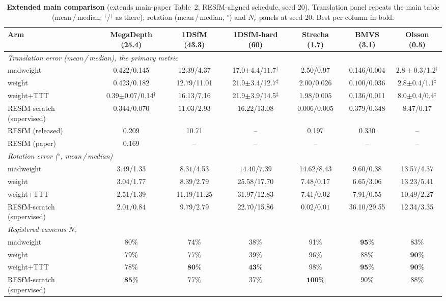 \documentclass[10pt,twocolumn,letterpaper]{article}
\renewcommand{\deg}{^{\circ}}
\begin{document}
\begin{table}[t]\centering\footnotesize
\caption{\textbf{Extended main comparison} (extends main-paper Table~2; RESfM-aligned
schedule, seed 20). Translation panel repeats the main table (mean\,/\,median;
$^{\dagger}$/$^{\ddagger}$ as there); rotation (mean\,/\,median, $\deg$) and $N_r$
panels at seed 20. Best per column in bold.}
\label{tab:x_main}
\setlength{\tabcolsep}{3pt}%
\begin{tabular}{lcccccc}
\toprule
Arm & MegaDepth (25.4) & 1DSfM (43.3) & 1DSfM-hard (60) & Strecha (1.7) & BMVS (3.1) & Olsson (0.5)\\
\midrule
\multicolumn{7}{l}{\emph{Translation error (mean\,/\,median), the primary metric}}\\[1pt]
madweight    & 0.422/0.145 & 12.39/4.37 & 17.0$\pm$4.4/$\mathbf{11.7}$$^{\ddagger}$ & 2.50/0.97 & 0.146/$\mathbf{0.004}$ & $\mathbf{2.8\pm 0.3}$/1.2$^{\ddagger}$\\
weight       & 0.423/0.182 & 12.79/11.01 & 21.9$\pm$3.4/12.7$^{\ddagger}$ & 2.00/0.026 & $\mathbf{0.100}$/0.036 & 2.8$\pm$0.4/1.1$^{\ddagger}$\\
weight+TTT   & 0.39$\pm$0.07/0.14$^{\dagger}$ & 16.13/7.16 & 21.9$\pm$3.9/14.5$^{\ddagger}$ & 1.98/$\mathbf{0.005}$ & 0.136/0.011 & 8.0$\pm$0.4/0.4$^{\ddagger}$\\
RESfM-scratch (supervised)  & $\mathbf{0.344/0.070}$ & $\mathbf{11.03/2.93}$ & $\mathbf{16.22}$/13.08 & $\mathbf{0.006/0.005}$ & 0.379/0.348 & 8.47/$\mathbf{0.17}$\\
RESfM (released)            & 0.209 & 10.71 & -- & 0.197 & 0.330 & --\\
RESfM (paper)               & 0.169 & -- & -- & -- & -- & --\\
\midrule
\multicolumn{7}{l}{\emph{Rotation error ($\deg$, mean\,/\,median)}}\\[1pt]
madweight    & 3.49/1.33 & $\mathbf{8.31}$/4.53 & $\mathbf{14.40}$/$\mathbf{7.39}$ & 14.62/8.43 & 9.60/0.38 & 13.57/4.37\\
weight       & 3.04/1.77 & 8.39/$\mathbf{2.79}$ & 25.58/17.70 & 7.48/0.17 & $\mathbf{6.65}$/3.06 & 13.23/5.41\\
weight+TTT   & 2.51/1.39 & 11.19/11.25 & 31.97/12.83 & 7.41/0.02 & 7.91/$\mathbf{0.55}$ & $\mathbf{10.49}$/$\mathbf{2.27}$\\
RESfM-scratch (supervised)  & $\mathbf{2.01/0.84}$ & 9.79/$\mathbf{2.79}$ & 22.70/15.86 & $\mathbf{0.02/0.01}$ & 36.10/29.55 & 12.34/3.35\\
\midrule
\multicolumn{7}{l}{\emph{Registered cameras $N_r$}}\\[1pt]
madweight    & 80\% & 74\% & 38\% & 91\% & $\mathbf{95}$\% & 83\%\\
weight       & 79\% & 77\% & 39\% & 96\% & 88\% & $\mathbf{90}$\%\\
weight+TTT   & 78\% & $\mathbf{80}$\% & $\mathbf{43}$\% & 98\% & $\mathbf{95}$\% & $\mathbf{90}$\%\\
RESfM-scratch (supervised)  & $\mathbf{85}$\% & 77\% & 37\% & $\mathbf{100}$\% & 90\% & 88\%\\
\bottomrule
\end{tabular}
\end{table}
\end{document}
